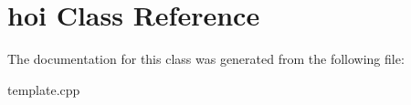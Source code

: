\hypertarget{classhoi}{}\section{hoi Class Reference}
\label{classhoi}


The documentation for this class was generated from the following file\+:\begin{DoxyCompactItemize}
\item 
template.\+cpp\end{DoxyCompactItemize}

